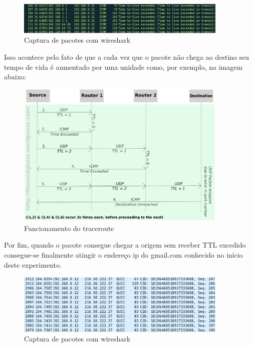 \begin{figure}[h]
  \centering
  \includegraphics[width=0.9\textwidth]{figuras/f8.eps}
  \caption{Captura de pacotes com wireshark}
  \label{fig:f8}
\end{figure}

Isso acontece pelo fato de que a cada vez que o pacote não chega ao destino
seu tempo de vida é aumentado por uma unidade como, por exemplo, na imagem abaixo:

\begin{figure}[h]
  \centering
  \includegraphics[width=0.9\textwidth]{figuras/f9.eps}
  \caption{Funcionamento do traceroute}
  \label{fig:f9}
\end{figure}

Por fim, quando o pacote consegue chegar a origem sem receber TTL excedido
consegue-se finalmente atingir o endereço ip do gmail.com conhecido no
início deste experimento.

\begin{figure}[h]
  \centering
  \includegraphics[width=0.9\textwidth]{figuras/f10.eps}
  \caption{Captura de pacotes com wireshark}
  \label{fig:f10}
\end{figure}


